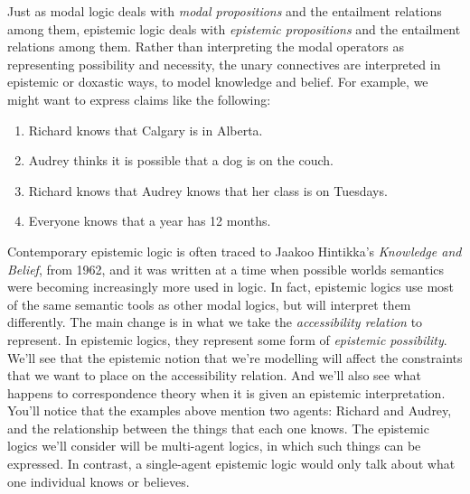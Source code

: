 \documentclass[../../../include/open-logic-section]{subfiles}
\begin{document}


Just as modal logic deals with \emph{modal propositions} and the entailment relations among them, epistemic logic deals with \emph{epistemic propositions} and the entailment relations among them. Rather than interpreting the modal operators as representing possibility and necessity, the unary connectives are interpreted in epistemic or doxastic ways, to model knowledge and belief. For example, we might want to express claims like the following:

\begin{enumerate}
\item Richard knows that Calgary is in Alberta.
\item Audrey thinks it is possible that a dog is on the couch.
\item Richard knows that Audrey knows that her class is on Tuesdays.
\item Everyone knows that a year has 12 months.
\end{enumerate}
Contemporary epistemic logic is often traced to Jaakoo Hintikka's \emph{Knowledge and Belief}, from 1962, and it was written at a time when possible worlds semantics were becoming increasingly more used in logic. In fact, epistemic logics use most of the same semantic tools as other modal logics, but will interpret them differently. The main change is in what we take the \emph{accessibility relation} to represent. In epistemic logics, they represent some form of \emph{epistemic possibility}. We'll see that the epistemic notion that we're modelling will affect the constraints that we want to place on the accessibility relation. And we'll also see what happens to correspondence theory when it is given an epistemic interpretation. You'll notice that the examples above mention two agents: Richard and Audrey, and the relationship between the things that each one knows. The epistemic logics we'll consider will be multi-agent logics, in which such things can be expressed. In contrast, a single-agent epistemic logic would only talk about what one individual knows or believes.
\end{document}
